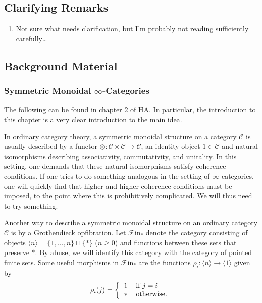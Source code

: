 \documentclass[letterpaper]{article}
\theoremstyle{definition}
\begin{document}
\subsection{Clarifying Remarks}

\begin{enumerate}
    \item Not sure what needs clarification, but I'm probably not reading sufficiently carefully\ldots
\end{enumerate}


\subsection{Background Material}

\subsubsection{Symmetric Monoidal $\infty$-Categories}
The following can be found in chapter 2 of \href{References/LurieHigherAlgebra.pdf}{HA}. In particular, the introduction to this chapter is a very clear introduction to the main idea.

In ordinary category theory, a symmetric monoidal structure on a category $\mathcal{C}$ is usually described by a functor $\otimes : \mathcal{C} \times \mathcal{C} \to \mathcal{C}$, an identity object $1 \in \mathcal{C}$ and natural isomorphisms describing associativity, commutativity, and unitality. In this setting, one demands that these natural isomorphisms satisfy coherence conditions. If one tries to do something analogous in the setting of $\infty$-categories, one will quickly find that higher and higher coherence conditions must be imposed, to the point where this is prohibitively complicated. We will thus need to try something.

Another way to describe a symmetric monoidal structure on an ordinary category $\mathcal{C}$ is by a Grothendieck opfibration. Let $\mathscr{F}\mathrm{in}_*$ denote the category consisting of objects $\langle n \rangle = \{1, \ldots, n \} \sqcup \{*\}$ ($n \geq 0$) and functions between these sets that preserve $*$. By abuse, we will identify this category with the category of pointed finite sets. Some useful morphisms in $\mathscr{F}\mathrm{in}_*$ are the functions $\rho_i: \langle n \rangle \to \langle 1 \rangle$ given by
\[
    \rho_i(j) = \left\{
    \begin{tabular}{cl}
        $1$ & if $j=i$ \\
        $*$ & otherwise.
    \end{tabular}
    \right.
\]
\end{document}
